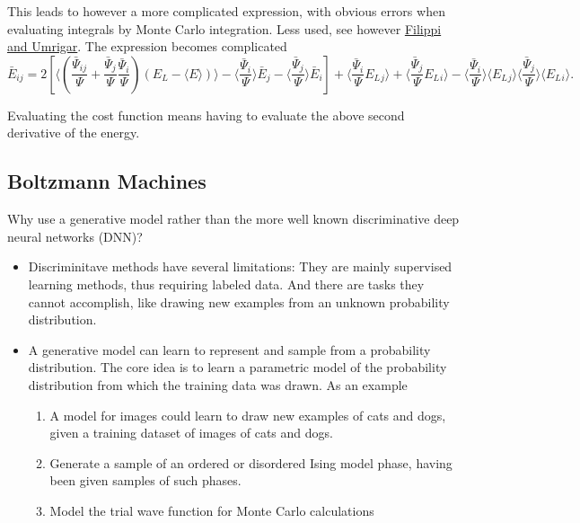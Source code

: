\documentclass[%
oneside,                 %
final,                   %
10pt]{article}
\begin{document}
This leads to however a more complicated expression, with obvious errors when evaluating integrals by Monte Carlo integration. Less used, see however \href{{https://journals.aps.org/prl/abstract/10.1103/PhysRevLett.94.150201}}{Filippi and Umrigar}. The expression becomes complicated
\[
\bar{E}_{ij} = 2\left[ \langle (\frac{\bar{\Psi}_{ij}}{\Psi}+\frac{\bar{\Psi}_{j}}{\Psi}\frac{\bar{\Psi}_{i}}{\Psi})(E_L-\langle E\rangle)\rangle -\langle \frac{\bar{\Psi}_{i}}{\Psi}\rangle\bar{E}_j-\langle \frac{\bar{\Psi}_{j}}{\Psi}\rangle\bar{E}_i\right] +\langle \frac{\bar{\Psi}_{i}}{\Psi}E_L{_j}\rangle +\langle \frac{\bar{\Psi}_{j}}{\Psi}E_L{_i}\rangle -\langle \frac{\bar{\Psi}_{i}}{\Psi}\rangle\langle E_L{_j}\rangle \langle \frac{\bar{\Psi}_{j}}{\Psi}\rangle\langle E_L{_i}\rangle.  
\]

Evaluating the cost function means having to evaluate the above second derivative of the energy.







\subsection{Boltzmann Machines}

Why use a generative model rather than the more well known discriminative deep neural networks (DNN)? 

\begin{itemize}
\item Discriminitave methods have several limitations: They are mainly supervised learning methods, thus requiring labeled data. And there are tasks they cannot accomplish, like drawing new examples from an unknown probability distribution.

\item A generative model can learn to represent and sample from a probability distribution. The core idea is to learn a parametric model of the probability distribution from which the training data was drawn. As an example
\begin{enumerate}

 \item A model for images could learn to draw new examples of cats and dogs, given a training dataset of images of cats and dogs.

 \item Generate a sample of an ordered or disordered Ising model phase, having been given samples of such phases.

 \item Model the trial wave function for Monte Carlo calculations
\end{enumerate}

\noindent
\end{itemize}
\end{document}
